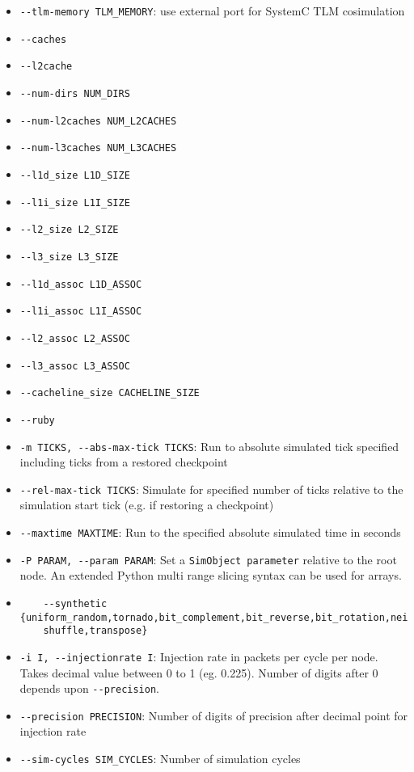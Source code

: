 \documentclass{article}
\begin{document}
\begin{itemize}
	\item \verb|--tlm-memory TLM_MEMORY|: use external port for SystemC TLM cosimulation
	\item \verb|--caches|
	\item \verb|--l2cache|
	\item \verb|--num-dirs NUM_DIRS|
	\item \verb|--num-l2caches NUM_L2CACHES|
	\item \verb|--num-l3caches NUM_L3CACHES|
	\item \verb|--l1d_size L1D_SIZE|
	\item \verb|--l1i_size L1I_SIZE|
	\item \verb|--l2_size L2_SIZE|
	\item \verb|--l3_size L3_SIZE|
	\item \verb|--l1d_assoc L1D_ASSOC|
	\item \verb|--l1i_assoc L1I_ASSOC|
	\item \verb|--l2_assoc L2_ASSOC|
	\item \verb|--l3_assoc L3_ASSOC|
	\item \verb|--cacheline_size CACHELINE_SIZE|
	\item \verb|--ruby|
	\item \verb|-m TICKS, --abs-max-tick TICKS|: Run to absolute simulated tick specified including ticks from a restored checkpoint
	\item \verb|--rel-max-tick TICKS|: Simulate for specified number of ticks relative to the simulation start tick (e.g. if restoring a checkpoint)
	\item \verb|--maxtime MAXTIME|: Run to the specified absolute simulated time in seconds
	\item \verb|-P PARAM, --param PARAM|: Set a \verb|SimObject parameter| relative to the root node. An extended Python multi range slicing syntax can be used for arrays. 
	\item \begin{verbatim}
	--synthetic {uniform_random,tornado,bit_complement,bit_reverse,bit_rotation,neighbor,
	shuffle,transpose}\end{verbatim}
	\item \verb|-i I, --injectionrate I|: Injection rate in packets per cycle per node. Takes decimal value between 0 to 1 (eg. 0.225). Number of digits after 0 depends upon \verb|--precision|.
	\item \verb|--precision PRECISION|: Number of digits of precision after decimal point for injection rate
	\item \verb|--sim-cycles SIM_CYCLES|: Number of simulation cycles

\end{itemize}
\end{document}

